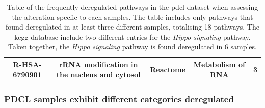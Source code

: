 \begin{table}
{\begin{tabular}{ |c|c|c|c|c| }
            R-HSA-6790901 & rRNA modification in the nucleus and cytosol & Reactome & Metabolism of RNA & 3 \\
            \hline
        \end{tabular}
    }
    \caption{
        Table of the frequently deregulated pathways in the \acrshort{pdcl} dataset when assessing the alteration specfic to each samples.
        The table includes only pathways that found deregulated in at least three different samples, totalising 18 pathways.
        The \acrshort{kegg} database include two different entries for the \textit{Hippo signaling} pathway.
        Taken together, the \textit{Hippo signaling} pathway is found deregulated in 6 samples.
    }
    \label{table:frequently-dereg-pathways}
\end{table}

\subsubsection{PDCL samples exhibit different categories deregulated}

